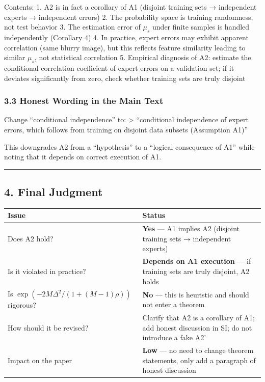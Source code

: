 \documentclass[
  12pt,
]{ctexart}
\begin{document}
Contents:
1. A2 is in fact a corollary of A1 (disjoint training sets → independent experts → independent errors)
2. The probability space is training randomness, not test behavior
3. The estimation error of \(\mu_s\) under finite samples is handled independently (Corollary 4)
4. In practice, expert errors may exhibit apparent correlation (same blurry image), but this reflects feature similarity leading to similar \(\mu_s\), not statistical correlation
5. Empirical diagnosis of A2: estimate the conditional correlation coefficient of expert errors on a validation set; if it deviates significantly from zero, check whether training sets are truly disjoint

\subsubsection{3.3 Honest Wording in the Main Text}\label{honest-wording-in-main-text}

Change ``conditional independence'' to: \textgreater{} ``conditional independence of expert errors, which follows from training on disjoint data subsets (Assumption A1)''

This downgrades A2 from a ``hypothesis'' to a ``logical consequence of A1'' while noting that it depends on correct execution of A1.

\begin{center}\rule{0.5\linewidth}{0.5pt}\end{center}

\subsection{4. Final Judgment}\label{final-judgment}

\begin{longtable}[]{@{}
  >{\raggedright\arraybackslash}p{}
  >{\centering\arraybackslash}p{}@{}}
\toprule\noalign{}
\begin{minipage}[b]{\linewidth}\raggedright
Issue
\end{minipage} & \begin{minipage}[b]{\linewidth}\centering
Status
\end{minipage} \\
\midrule\noalign{}
\endhead
\bottomrule\noalign{}
\endlastfoot
Does A2 hold? & \textbf{Yes} --- A1 implies A2 (disjoint training sets → independent experts) \\
Is it violated in practice? & \textbf{Depends on A1 execution} --- if training sets are truly disjoint, A2 holds \\
Is \(\exp(-2M\Delta^2/(1+(M-1)\rho))\) rigorous? & \textbf{No} --- this is heuristic and should not enter a theorem \\
How should it be revised? & Clarify that A2 is a corollary of A1; add honest discussion in SI; do not introduce a fake A2' \\
Impact on the paper & \textbf{Low} --- no need to change theorem statements, only add a paragraph of honest discussion \\
\end{longtable}
\end{document}
